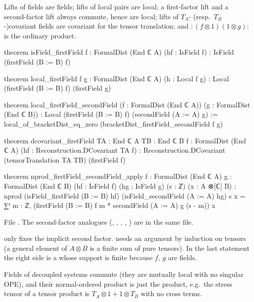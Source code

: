 \begin{theorem}\label{l03:thm:tensorlift}
Lifts of fields are fields; lifts of local pairs are local; a first-factor lift and a second-factor
lift always commute, hence are local; lifts of $T_A$- (resp.\ $T_B$-)covariant fields are covariant for
the tensor translation; and ${:}(f\otimes1)(1\otimes g){:}$ is the ordinary product.
\end{theorem}
\begin{leancode}
theorem isField_firstField {f : FormalDist (End ℂ A)} (hf : IsField f) :
    IsField (firstField (B := B) f)

theorem local_firstField {f g : FormalDist (End ℂ A)} (h : Local f g) :
    Local (firstField (B := B) f) (firstField g)

theorem local_firstField_secondField (f : FormalDist (End ℂ A))
    (g : FormalDist (End ℂ B)) :
    Local (firstField (B := B) f) (secondField (A := A) g) :=
  local_of_bracketDist_eq_zero (bracketDist_firstField_secondField f g)

theorem dcovariant_firstField {TA : End ℂ A} {TB : End ℂ B}
    {f : FormalDist (End ℂ A)} (hf : Reconstruction.DCovariant TA f) :
    Reconstruction.DCovariant (tensorTranslation TA TB) (firstField f)

theorem nprod_firstField_secondField_apply {f : FormalDist (End ℂ A)}
    {g : FormalDist (End ℂ B)} (hf : IsField f) (hg : IsField g) (s : ℤ)
    (x : A ⊗[ℂ] B) :
    nprod (isField_firstField (B := B) hf) (isField_secondField (A := A) hg) s x
      = ∑ᶠ m : ℤ,
          (firstField (B := B) f m * secondField (A := A) g (s - m)) x
\end{leancode}
File . The second-factor analogues
(, , ,
, ) are in the same file.

\begin{dictionary}
 only fixes the implicit second factor.  needs an argument by
induction on tensors (a general element of $A\otimes B$ is a finite sum of pure tensors). In the last
statement the right side is a  whose support is finite because $f$, $g$ are fields.
\end{dictionary}

\begin{physics}
Fields of decoupled systems commute (they are mutually local with no singular OPE), and their
normal-ordered product is just the product, e.g.\ the stress tensor of a tensor product is
$T_A\otimes1+1\otimes T_B$ with no cross terms.
\end{physics}

